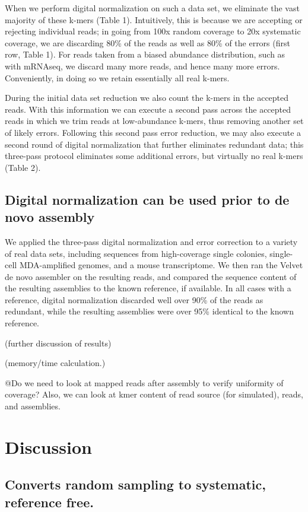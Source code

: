 \documentclass[10pt]{article}
\begin{document}
When we perform digital normalization on such a data set, we eliminate
the vast majority of these k-mers (Table 1).  Intuitively, this is
because we are accepting or rejecting individual reads; in going from
100x random coverage to 20x systematic coverage, we are discarding
80\% of the reads as well as 80\% of the errors (first row, Table 1).
For reads taken from a biased abundance distribution, such as with
mRNAseq, we discard many more reads, and hence many more errors.
Conveniently, in doing so we retain essentially all real k-mers.

During the initial data set reduction we also count the k-mers in the
accepted reads.  With this information we can execute a second pass
across the accepted reads in which we trim reads at low-abundance
k-mers, thus removing another set of likely errors.  Following this
second pass error reduction, we may also execute a second round of
digital normalization that further eliminates redundant data; this
three-pass protocol eliminates some additional errors, but virtually
no real k-mers (Table 2).

\subsection*{Digital normalization can be used prior to de novo assembly}

We applied the three-pass digital normalization and error correction
to a variety of real data sets, including sequences from high-coverage
single colonies, single-cell MDA-amplified genomes, and a mouse
transcriptome.  We then ran the Velvet de novo assembler on the
resulting reads, and compared the sequence content of the resulting
assemblies to the known reference, if available.  In all cases with
a reference, digital normalization discarded well over 90\% of the
reads as redundant, while the resulting assemblies were over 95\%
identical to the known reference.


(further discussion of results)

(memory/time calculation.)

@Do we need to look at mapped reads after assembly to verify uniformity
of coverage? Also, we can look at kmer content of read source (for
simulated), reads, and assemblies.

\section*{Discussion}

\subsection*{Converts random sampling to systematic, reference free.}
\end{document}
